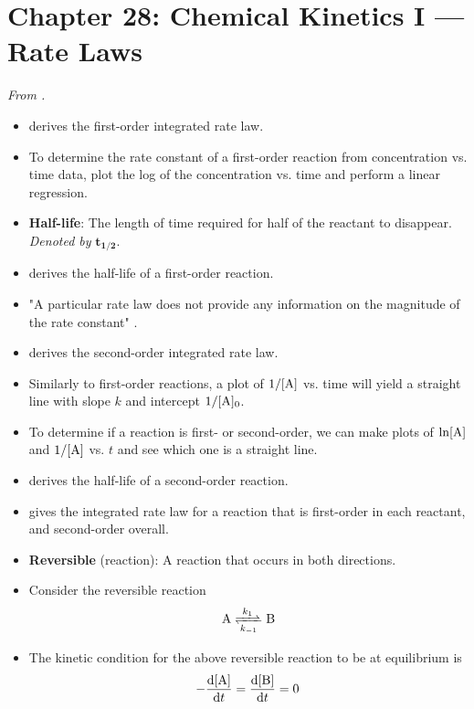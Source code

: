 \documentclass[../notes.tex]{subfiles}
\begin{document}
\section{Chapter 28: Chemical Kinetics I --- Rate Laws}
\emph{From \textcite{bib:McQuarrieSimon}.}
\begin{itemize}
    \item {}\textcite{bib:McQuarrieSimon} derives the first-order integrated rate law.
    \item To determine the rate constant of a first-order reaction from concentration vs. time data, plot the log of the concentration vs. time and perform a linear regression.
    \item \textbf{Half-life}: The length of time required for half of the reactant to disappear. \emph{Denoted by} $\bm{t_{1/2}}$.
    \item \textcite{bib:McQuarrieSimon} derives the half-life of a first-order reaction.
    \item "A particular rate law does not provide any information on the magnitude of the rate constant" \parencite[1057]{bib:McQuarrieSimon}.
    \item \textcite{bib:McQuarrieSimon} derives the second-order integrated rate law.
    \item Similarly to first-order reactions, a plot of $1/[\ce{A}]$ vs. time will yield a straight line with slope $k$ and intercept $1/[\ce{A}]_0$.
    \item To determine if a reaction is first- or second-order, we can make plots of $\ln[\ce{A}]$ and $1/[\ce{A}]$ vs. $t$ and see which one is a straight line.
    \item \textcite{bib:McQuarrieSimon} derives the half-life of a second-order reaction.
    \item \textcite{bib:McQuarrieSimon} gives the integrated rate law for a reaction that is first-order in each reactant, and second-order overall.
    \item \textbf{Reversible} (reaction): A reaction that occurs in both directions.
    \item Consider the reversible reaction
    \begin{equation*}
        \ce{A <=>[$k_1$][$k_{-1}$] B}
    \end{equation*}
    \item The kinetic condition for the above reversible reaction to be at equilibrium is
    \begin{equation*}
        -\dv{[\ce{A}]}{t} = \dv{[\ce{B}]}{t} = 0

\end{equation*}
\end{itemize}
\end{document}
